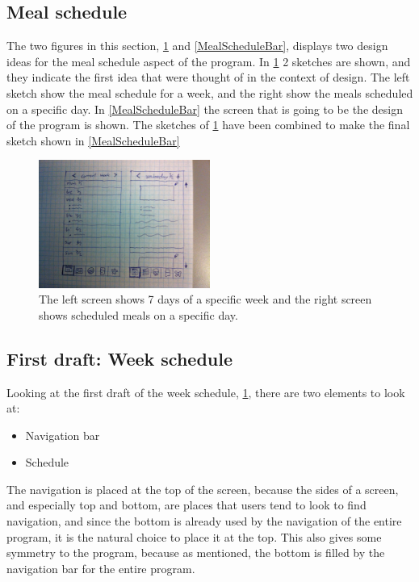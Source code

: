 \subsection{Meal schedule}

The two figures in this section, \cref{MealScheduleList} and \cref{MealScheduleBar}, displays two design ideas for the meal schedule aspect of the program. In \cref{MealScheduleList} 2 sketches are shown, and they indicate the first idea that were thought of in the context of design. The left sketch show the meal schedule for a week, and the right show the meals scheduled on a specific day. In \cref{MealScheduleBar} the screen that is going to be the design of the program is shown. The sketches of \cref{MealScheduleList} have been combined to make the final sketch shown in \cref{MealScheduleBar}

\begin{figure}[H]
	\centering
    \includegraphics[width=0.5\textwidth]{Grafik/FoodPlanner/FinalMealScheduleSketch1}
	\caption{The left screen shows 7 days of a specific week and the right screen shows scheduled meals on a specific day.}
	\label{MealScheduleList}
\end{figure}

\subsection{First draft: Week schedule} \label{FirstDraftWeekSchedule}

Looking at the first draft of the week schedule, \cref{MealScheduleList}, there are two elements to look at:

\begin{itemize}
    \item Navigation bar
    \item Schedule
\end{itemize}

The navigation is placed at the top of the screen, because the sides of a screen, and especially top and bottom, are places that users tend to look to find navigation, and since the bottom is already used by the navigation of the entire program, it is the natural choice to place it at the top. This also gives some symmetry to the program, because as mentioned, the bottom is filled by the navigation bar for the entire program.

